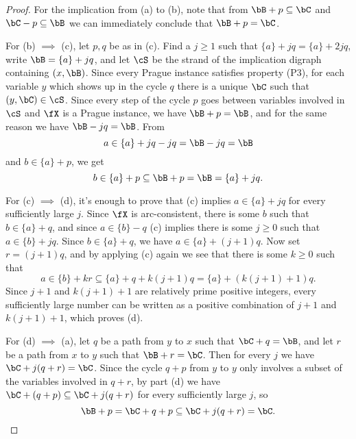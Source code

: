 \begin{proof} For the implication from (a) to (b), note that from $\bB + p \subseteq \bC$ and $\bC - p \subseteq \bB$ we can immediately conclude that $\bB + p = \bC$.

For (b) $\implies$ (c), let $p,q$ be as in (c). Find a $j \ge 1$ such that $\{a\} + jq = \{a\} + 2jq$, write $\bB = \{a\} + jq$, and let $\cS$ be the strand of the implication digraph containing $(x, \bB)$. Since every Prague instance satisfies property (P3), for each variable $y$ which shows up in the cycle $q$ there is a unique $\bC$ such that $(y,\bC) \in \cS$. Since every step of the cycle $p$ goes between variables involved in $\cS$ and $\fX$ is a Prague instance, we have $\bB + p = \bB$, and for the same reason we have $\bB - jq = \bB$. From
\[
a \in \{a\} + jq - jq = \bB - jq = \bB
\]
and $b \in \{a\} + p$, we get
\[
b \in \{a\} + p \subseteq \bB + p = \bB = \{a\} + jq.
\]

For (c) $\implies$ (d), it's enough to prove that (c) implies $a \in \{a\} + jq$ for every sufficiently large $j$. Since $\fX$ is arc-consistent, there is some $b$ such that $b \in \{a\} + q$, and since $a \in \{b\} - q$ (c) implies there is some $j \ge 0$ such that $a \in \{b\} + jq$. Since $b \in \{a\} + q$, we have $a \in \{a\} + (j+1)q$. Now set $r = (j+1)q$, and by applying (c) again we see that there is some $k \ge 0$ such that
\[
a \in \{b\} + kr \subseteq \{a\} + q + k(j+1)q = \{a\} + (k(j+1) + 1)q.
\]
Since $j+1$ and $k(j+1) + 1$ are relatively prime positive integers, every sufficiently large number can be written as a positive combination of $j+1$ and $k(j+1)+1$, which proves (d).

For (d) $\implies$ (a), let $q$ be a path from $y$ to $x$ such that $\bC + q = \bB$, and let $r$ be a path from $x$ to $y$ such that $\bB + r = \bC$. Then for every $j$ we have $\bC + j(q+r) = \bC$. Since the cycle $q+p$ from $y$ to $y$ only involves a subset of the variables involved in $q+r$, by part (d) we have $\bC + (q+p) \subseteq \bC + j(q+r)$ for every sufficiently large $j$, so
\[
\bB + p = \bC + q+p \subseteq \bC + j(q+r) = \bC.\qedhere
\]
\end{proof}

